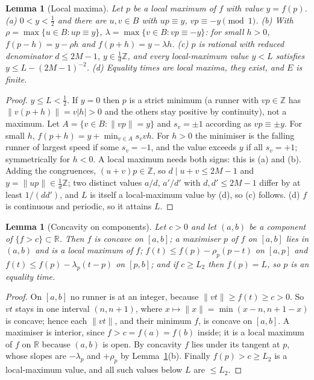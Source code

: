 \documentclass[11pt]{article}
\newtheorem{lemma}[theorem]{Lemma}
\theoremstyle{definition}
\theoremstyle{remark}
\newcommand{\nd}[1]{\lVert #1\rVert}
\newcommand{\ZZ}{\mathbb{Z}}
\newcommand{\RR}{\mathbb{R}}
\begin{document}
\begin{lemma}[Local maxima]\label{lem:loc}
Let $p$ be a local maximum of $f$ with value $y=f(p)$. (a) $0<y<\frac12$ and there are $u,v\in B$ with $up\equiv y$, $vp\equiv-y\pmod1$. (b) With $\rho=\max\{u\in B:up\equiv y\}$, $\lambda=\max\{v\in B:vp\equiv-y\}$: for small $h>0$, $f(p-h)=y-\rho h$ and $f(p+h)=y-\lambda h$. (c) $p$ is rational with reduced denominator $d\le2M-1$, $y\in\frac1d\ZZ$, and every local-maximum value $y<L$ satisfies $y\le L-(2M-1)^{-2}$. (d) Equality times are local maxima, they exist, and $E$ is finite.
\end{lemma}
\begin{proof}
$y\le L<\frac12$. If $y=0$ then $p$ is a strict minimum (a runner with $vp\in\ZZ$ has $\nd{v(p+h)}=v|h|>0$ and the others stay positive by continuity), not a maximum. Let $A=\{v\in B:\nd{vp}=y\}$ and $s_v=\pm1$ according as $vp\equiv\pm y$. For small $h$, $f(p+h)=y+\min_{v\in A}s_vvh$. For $h>0$ the minimiser is the falling runner of largest speed if some $s_v=-1$, and the value exceeds $y$ if all $s_v=+1$; symmetrically for $h<0$. A local maximum needs both signs: this is (a) and (b). Adding the congruences, $(u+v)p\in\ZZ$, so $d\mid u+v\le2M-1$ and $y=\nd{up}\in\frac1d\ZZ$; two distinct values $a/d$, $a'/d'$ with $d,d'\le2M-1$ differ by at least $1/(dd')$, and $L$ is itself a local-maximum value by (d), so (c) follows. (d) $f$ is continuous and periodic, so it attains $L$.
\end{proof}

\begin{lemma}[Concavity on components]\label{lem:conc}
Let $c>0$ and let $(a,b)$ be a component of $\{f>c\}\subset\RR$. Then $f$ is concave on $[a,b]$; a maximiser $p$ of $f$ on $[a,b]$ lies in $(a,b)$ and is a local maximum of $f$; $f(t)\le f(p)-\rho_p(p-t)$ on $[a,p]$ and $f(t)\le f(p)-\lambda_p(t-p)$ on $[p,b]$; and if $c\ge L_2$ then $f(p)=L$, so $p$ is an equality time.
\end{lemma}
\begin{proof}
On $[a,b]$ no runner is at an integer, because $\nd{vt}\ge f(t)\ge c>0$. So $vt$ stays in one interval $(n,n+1)$, where $x\mapsto\nd{x}=\min(x-n,n+1-x)$ is concave; hence each $\nd{vt}$, and their minimum $f$, is concave on $[a,b]$. A maximiser is interior, since $f>c=f(a)=f(b)$ inside; it is a local maximum of $f$ on $\RR$ because $(a,b)$ is open. By concavity $f$ lies under its tangent at $p$, whose slopes are $-\lambda_p$ and $+\rho_p$ by Lemma~\ref{lem:loc}(b). Finally $f(p)>c\ge L_2$ is a local-maximum value, and all such values below $L$ are $\le L_2$.
\end{proof}
\end{document}
